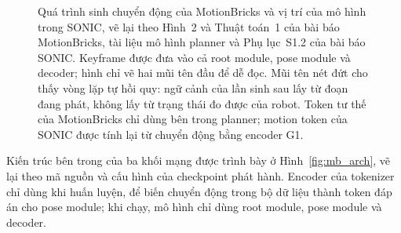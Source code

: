 \documentclass[12pt,a4paper,oneside]{report}
\begin{document}
\begin{figure}[!htb]
{}
\caption[Quá trình sinh chuyển động của MotionBricks và vị trí của mô hình trong SONIC]{Quá trình sinh chuyển động của MotionBricks và vị trí của mô hình trong SONIC, vẽ lại theo Hình~2 và Thuật toán~1 của bài báo MotionBricks, tài liệu mô hình planner và Phụ lục~S1.2 của bài báo SONIC. Keyframe được đưa vào cả root module, pose module và decoder; hình chỉ vẽ hai mũi tên đầu để dễ đọc. Mũi tên nét đứt cho thấy vòng lặp tự hồi quy: ngữ cảnh của lần sinh sau lấy từ đoạn đang phát, không lấy từ trạng thái đo được của robot. Token tư thế của MotionBricks chỉ dùng bên trong planner; motion token của SONIC được tính lại từ chuyển động bằng encoder G1.}
\label{fig:motionbricks}
\end{figure}

Kiến trúc bên trong của ba khối mạng được trình bày ở Hình~\ref{fig:mb_arch}, vẽ lại theo mã nguồn và cấu hình của checkpoint phát hành. Encoder của tokenizer chỉ dùng khi huấn luyện, để biến chuyển động trong bộ dữ liệu thành token đáp án cho pose module; khi chạy, mô hình chỉ dùng root module, pose module và decoder.
\end{document}
